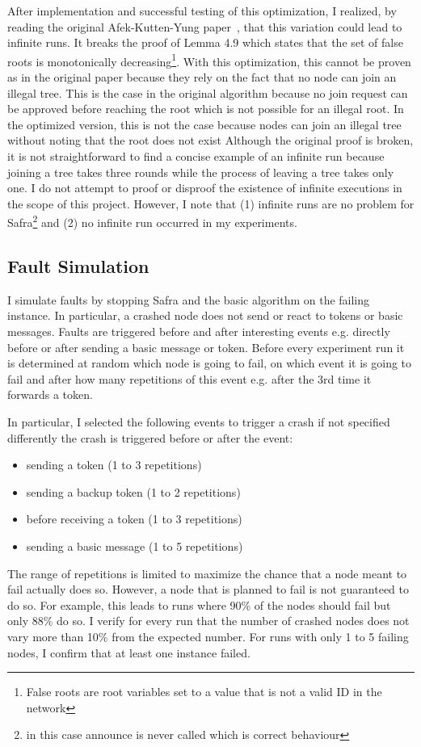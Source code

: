 After implementation and successful testing of this optimization, I realized, by reading the original Afek-Kutten-Yung paper~\cite{afek}, that this variation could lead to infinite runs.
It breaks the proof of Lemma 4.9 which states that the set of false roots is monotonically decreasing\footnote{False roots are root variables set to a value that is not a valid ID in the network}.
With this optimization, this cannot be proven as in the original paper because they rely on the fact that no node can join an illegal tree.
This is the case in the original algorithm because no join request can be approved before reaching the root which is not possible for an illegal root.
In the optimized version, this is not the case because nodes can join an illegal tree without noting that the root does not exist
Although the original proof is broken, it is not straightforward to find a concise example of an infinite run because joining a tree takes three rounds while the process of leaving a tree takes only one.
I do not attempt to proof or disproof the existence of infinite executions in the scope of this project.
However, I note that (1) infinite runs are no problem for Safra\footnote{in this case announce is never called which is correct behaviour} and (2) no infinite run occurred in my experiments.

\subsection{Fault Simulation}
I simulate faults by stopping Safra and the basic algorithm on the failing instance.
In particular, a crashed node does not send or react to tokens or basic messages.
Faults are triggered before and after interesting events e.g. directly before or after sending a basic message or token.
Before every experiment run it is determined at random which node is going to fail, on which event it is going to fail and after how many repetitions of this event e.g. after the 3rd time it forwards a token.

In particular, I selected the following events to trigger a crash if not specified differently the crash is triggered before or after the event:
\begin{itemize}
    \item sending a token (1 to 3 repetitions)
    \item sending a backup token (1 to 2 repetitions)
    \item before receiving a token (1 to 3 repetitions)
    \item sending a basic message (1 to 5 repetitions)
\end{itemize}
The range of repetitions is limited to maximize the chance that a node meant to fail actually does so.
However, a node that is planned to fail is not guaranteed to do so.
For example, this leads to runs where 90\% of the nodes should fail but only 88\% do so.
I verify for every run that the number of crashed nodes does not vary more than 10\% from the expected number. For runs with only 1 to 5 failing nodes, I confirm that at least one instance failed.


